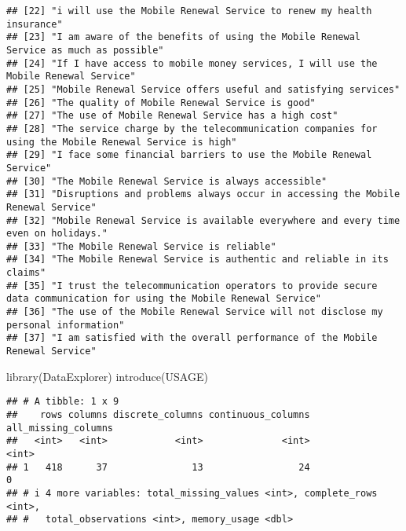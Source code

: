 \documentclass[
]{article}
\newenvironment{Shaded}{\begin{snugshade}}{\end{snugshade}}
\newcommand{\FunctionTok}[1]{\textcolor[rgb]{0.00,0.00,0.00}{#1}}
\newcommand{\NormalTok}[1]{#1}
\begin{document}
\begin{verbatim}
## [22] "i will use the Mobile Renewal Service to renew my health insurance"                                               
## [23] "I am aware of the benefits of using the Mobile Renewal Service as much as possible"                               
## [24] "If I have access to mobile money services, I will use the Mobile Renewal Service"                                 
## [25] "Mobile Renewal Service offers useful and satisfying services"                                                     
## [26] "The quality of Mobile Renewal Service is good"                                                                    
## [27] "The use of Mobile Renewal Service has a high cost"                                                                
## [28] "The service charge by the telecommunication companies for using the Mobile Renewal Service is high"               
## [29] "I face some financial barriers to use the Mobile Renewal Service"                                                 
## [30] "The Mobile Renewal Service is always accessible"                                                                  
## [31] "Disruptions and problems always occur in accessing the Mobile Renewal Service"                                    
## [32] "Mobile Renewal Service is available everywhere and every time even on holidays."                                  
## [33] "The Mobile Renewal Service is reliable"                                                                           
## [34] "The Mobile Renewal Service is authentic and reliable in its claims"                                               
## [35] "I trust the telecommunication operators to provide secure data communication for using the Mobile Renewal Service"
## [36] "The use of the Mobile Renewal Service will not disclose my personal information"                                  
## [37] "I am satisfied with the overall performance of the Mobile Renewal Service"
\end{verbatim}

\begin{Shaded}
\begin{Highlighting}[]
\FunctionTok{library}\NormalTok{(DataExplorer)}
\FunctionTok{introduce}\NormalTok{(USAGE)}
\end{Highlighting}
\end{Shaded}

\begin{verbatim}
## # A tibble: 1 x 9
##    rows columns discrete_columns continuous_columns all_missing_columns
##   <int>   <int>            <int>              <int>               <int>
## 1   418      37               13                 24                   0
## # i 4 more variables: total_missing_values <int>, complete_rows <int>,
## #   total_observations <int>, memory_usage <dbl>
\end{verbatim}
\end{document}

